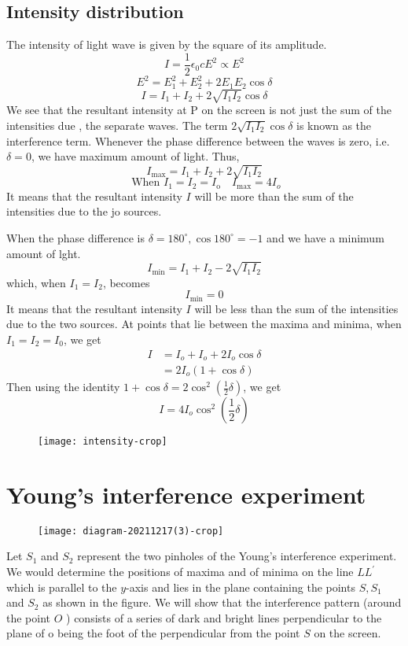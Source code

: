 \subsection{Intensity distribution}
The intensity of light wave is given by the square of its amplitude.\\
$$I=\frac{1}{2}\epsilon_{0}cE^2\propto E^2$$
$$E^{2}=E_{1}^{2}+E_{2}^{2}+2 E_{1} E_{2} \cos \delta$$
$$I=I_{1}+I_{2}+2 \sqrt{I_{1} I_{2}} \cos \delta$$
We see that the resultant intensity at $\mathrm{P}$ on the screen is not just the sum of the intensities due , the separate waves. The term $2 \sqrt{I_{1} I_{2}} \cos \delta$ is known as the interference term. Whenever the phase difference between the waves is zero, i.e. $\delta=0$, we have maximum amount of light. Thus,
$$
I_{\max }=I_{1}+I_{2}+2 \sqrt{I_{1} I_{2}}
$$
$$\text { When } I_{1}=I_{2}=I_{\mathrm{o}} \quad I_{\max }=4 I_{o}$$
It means that the resultant intensity $I$ will be more than the sum of the intensities due to the jo sources.

When the phase difference is $\delta=180^{\circ}, \cos 180^{\circ}=-1$ and we have a minimum amount of lght.
$$
I_{\min }=I_{1}+I_{2}-2 \sqrt{I_{1} I_{2}}
$$
which, when $I_{1}=I_{2}$, becomes
$$
I_{\min }=0
$$
It means that the resultant intensity $I$ will be less than the sum of the intensities due to the two sources.
At points that lie between the maxima and minima, when $I_{1}=I_{2}=I_{0}$, we get
$$
\begin{aligned}
I &=I_{o}+I_{o}+2 I_{o} \cos \delta \\
&=2 I_{o}(1+\cos \delta)
\end{aligned}
$$
Then using the identity $1+\cos \delta=2 \cos ^{2}\left(\frac{1}{2} \delta\right)$, we get
$$
I=4 I_{o} \cos ^{2}\left(\frac{1}{2} \delta\right)
$$
\begin{figure}[H]
	\centering
	\texttt{[image: intensity-crop]}
	\caption{}
	\label{}
\end{figure}
\section{Young's interference experiment}
\begin{figure}[H]
	\centering
	\texttt{[image: diagram-20211217(3)-crop]}
	\caption{}
	\label{}
\end{figure}
Let $S_{1}$ and $S_{2}$ represent the two pinholes of the Young's interference experiment. We would determine the positions of maxima and of minima on the line $L L^{\prime}$ which is parallel to the $y$-axis and lies in the plane containing the points $S, S_{1}$ and $S_{2}$ as shown in the figure. We will show that the interference pattern (around the point $O$ ) consists of a series of dark and bright lines perpendicular to the plane of o being the foot of the perpendicular from the point $S$ on the screen.

